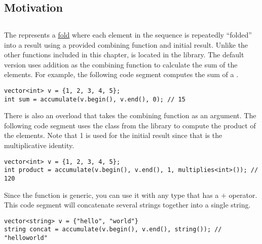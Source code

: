 \chapter{}\label{ch:algorithm}
\section{Motivation}\label{sec:algo-motivation}


\section{}\label{sec:algo-accumulate}

The  represents a \href{https://en.wikipedia.org/wiki/Fold_(higher-order_function)}{fold}
where each element in the sequence is repeatedly "`folded"' into a result using a provided combining function and initial result.
Unlike the other functions included in this chapter,  is located in the  library.
The default version uses addition as the combining function to calculate the sum of the elements.
For example, the following code segment computes the sum of a \vectortype.

\begin{lstlisting}
vector<int> v = {1, 2, 3, 4, 5};
int sum = accumulate(v.begin(), v.end(), 0); // 15
\end{lstlisting}

There is also an overload that takes the combining function as an argument.
The following code segment uses the  class from the  library to compute the product of the elements.
Note that 1 is used for the initial result since that is the multiplicative identity.

\begin{lstlisting}
vector<int> v = {1, 2, 3, 4, 5};
int product = accumulate(v.begin(), v.end(), 1, multiplies<int>()); // 120
\end{lstlisting}

Since the  function is generic, you can use it with any type that has a $+$ operator.
This code segment will concatenate several strings together into a single string.

\begin{lstlisting}
vector<string> v = {"hello", "world"}
string concat = accumulate(v.begin(), v.end(), string()); // "helloworld"
\end{lstlisting}


